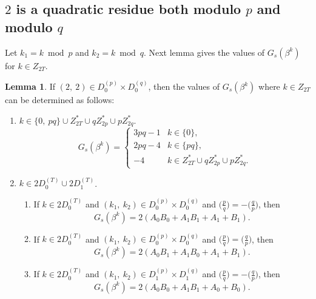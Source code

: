 \documentclass{mcom-l}
\theoremstyle{definition}
\newtheorem{sec3lemma8}[sec3lemma1]{Lemma}
\numberwithin{equation}{section}
\begin{document}
   \subsection{$ 2 $ is a quadratic residue both modulo $ p $ and modulo $ q $}  
    
     Let $ k_{1}=k\bmod p $ and $ k_{2}=k\bmod q $. Next lemma gives the values of $ G_{s}(\beta^{k}) $ for $ k\in Z_{2T} $.
     \begin{sec3lemma8}\label{lab_sec3_lemma8}
     If $ (2,\ 2)\in D_{0}^{(p)}\times D_{0}^{(q)} $, then the values of $ G_{s}(\beta^{k}) $ where $ k\in Z_{2T} $ can be determined as follows:
     \begin{enumerate} \item $ k\in \lbrace 0,\ pq \rbrace \cup Z^{*}_{2T}\cup qZ^{*}_{2p}\cup pZ^{*}_{2q} $.
     \begin{equation*}
     G_{s}(\beta^{k})=
     \begin{cases}
     3pq-1&k\in\lbrace 0\rbrace,\\
     2pq-4&k\in\lbrace pq\rbrace,\\
     -4   &k\in Z^{*}_{2T}\cup qZ^{*}_{2p}\cup pZ^{*}_{2q}.
     \end{cases}
     \end{equation*}
     \item $ k\in 2D_{0}^{(T)}\cup 2D_{1}^{(T)} $.
     \begin{enumerate}
     \item If $ k\in 2D^{(T)}_{0} $ and $ (k_{1},\ k_{2})\in D^{(p)}_{0}\times D^{(q)}_{0} $ and $ \bigl(\tfrac{p}{q}\bigr)=-\bigl(\tfrac{q}{p}\bigr) $, then
     \begin{equation*}
     G_{s}(\beta^{k})=2(A_{0}B_{0}+A_{1}B_{1}+A_{1}+B_{1}).
     \end{equation*}
     \item If $ k\in 2D^{(T)}_{0} $ and $ (k_{1},\ k_{2})\in D^{(p)}_{0}\times D^{(q)}_{0} $ and $ \bigl(\tfrac{p}{q}\bigr)=\bigl(\tfrac{q}{p}\bigr) $, then
     \begin{equation*}
     G_{s}(\beta^{k})=2(A_{0}B_{1}+A_{1}B_{0}+A_{1}+B_{1}).
     \end{equation*}
     \item If $ k\in 2D^{(T)}_{0} $ and $ (k_{1},\ k_{2})\in D^{(p)}_{1}\times D^{(q)}_{1} $ and $ \bigl(\tfrac{p}{q}\bigr)=-\bigl(\tfrac{q}{p}\bigr) $, then
     \begin{equation*}
     G_{s}(\beta^{k})=2(A_{0}B_{0}+A_{1}B_{1}+A_{0}+B_{0}).
     \end{equation*}

\end{enumerate}
\end{enumerate}
\end{sec3lemma8}
\end{document}
